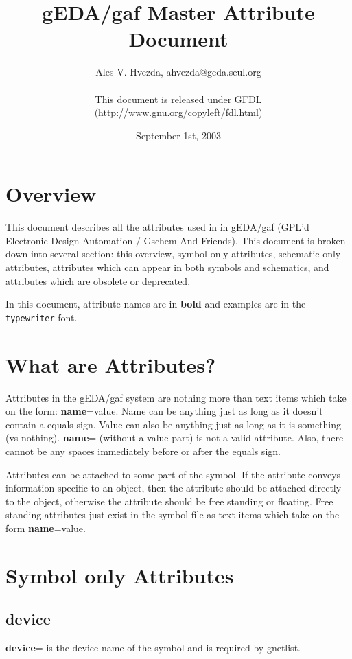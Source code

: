 \documentclass{article}
\title{gEDA/gaf Master Attribute Document}
\author{Ales V. Hvezda, ahvezda@geda.seul.org\\
	\\
	This document is released under GFDL\\ 
	(http://www.gnu.org/copyleft/fdl.html)}
\date{September 1st, 2003}
\begin{document}
\maketitle
\newpage

\tableofcontents
\newpage


\section{Overview}

This document describes all the attributes used in in gEDA/gaf (GPL'd
Electronic Design Automation / Gschem And Friends).  This document
is broken down into several section: this overview, symbol only
attributes, schematic only attributes, attributes which can appear
in both symbols and schematics, and attributes which are obsolete or
deprecated.

In this document, attribute names are in {\bf bold} and examples
are in the \texttt{typewriter} font.

\section{What are Attributes?}

Attributes in the gEDA/gaf system are nothing more than text items
which take on the form: {\bf name}=value.  Name can be anything just as long
as it doesn't contain a equals sign.  Value can also be anything just
as long as it is something (vs nothing).  {\bf name}= (without a value part)
is not a valid attribute.  Also, there cannot be any spaces immediately
before or after the equals sign.

Attributes can be attached to some part of the symbol.  If the attribute
conveys information specific to an object, then the attribute should
be attached directly to the object, otherwise the attribute should be
free standing or floating.  Free standing attributes just exist in the
symbol file as text items which take on the form {\bf name}=value.

\newpage

\section{Symbol only Attributes}


\subsection{\bf device\label{device}}
{\bf device}= is the device name of the symbol and is required by gnetlist.  
\end{document}

